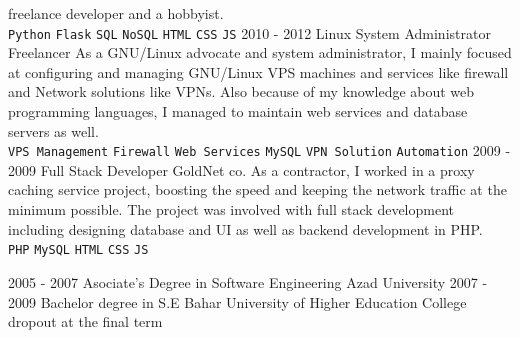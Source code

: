 \documentclass[12pt]{developercv}
\begin{document}
\begin{entrylist}
{		freelance developer and a hobbyist. 
		\\
		\texttt{Python}\slashsep
		\texttt{Flask}\slashsep
		\texttt{SQL}\slashsep
		\texttt{NoSQL}\slashsep
		\texttt{HTML}\slashsep
		\texttt{CSS}\slashsep
		\texttt{JS}
		}
	\entry
		{2010 - 2012}
		{Linux System Administrator}
		{Freelancer}
		{
		As a GNU/Linux advocate and system administrator, I mainly focused at
		configuring and managing GNU/Linux VPS machines and services like firewall
		and Network solutions like VPNs. Also because of my knowledge about web
		programming languages, I managed to maintain web services and database
		servers as well.
		\\
		\texttt{VPS Management}\slashsep
		\texttt{Firewall}\slashsep
		\texttt{Web Services}\slashsep
		\texttt{MySQL}\slashsep
		\texttt{VPN Solution}\slashsep
		\texttt{Automation}
		}
	\entry
		{2009 - 2009}
		{Full Stack Developer}
		{GoldNet co.}
		{
		As a contractor, I worked in a proxy caching service project, boosting the
		speed and keeping the network traffic at the minimum possible. The project
		was involved with full stack development including designing database and UI
		as well as backend development in PHP.
		\\
		\texttt{PHP}\slashsep
		\texttt{MySQL}\slashsep
		\texttt{HTML}\slashsep
		\texttt{CSS}\slashsep
		\texttt{JS}
		}
\end{entrylist}



\begin{entrylist}
	\entry
		{2005 - 2007}
		{Asociate's Degree in Software Engineering}
		{Azad University}
		{}
	\entry
		{2007 - 2009}
		{Bachelor degree in S.E}
		{Bahar University of Higher Education}
		{College dropout at the final term}
\end{entrylist}

\end{document}
